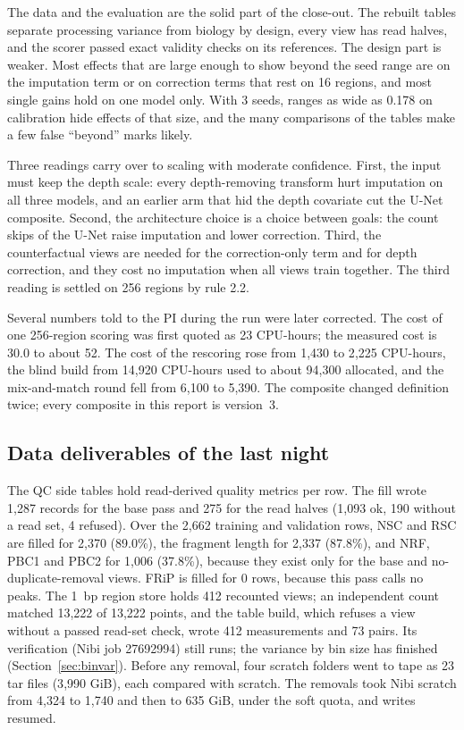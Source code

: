 \documentclass[pdflatex,sn-mathphys-num]{sn-jnl}
\newcommand{\lit}[1]{#1}
\newcommand{\cl}[1]{#1}
\newcommand{\arcGib}{3{,}990}
\newcommand{\arcTars}{23}
\newcommand{\blindNewCost}{94{,}300}
\newcommand{\blindOldCost}{14{,}920}
\newcommand{\bpMeas}{412}
\newcommand{\bpPairs}{73}
\newcommand{\bpPts}{13{,}222}
\newcommand{\bpPtsStore}{13{,}222}
\newcommand{\bpVerifyJob}{27692994}
\newcommand{\bpViews}{412}
\newcommand{\costAE}{30.0}
\newcommand{\costUN}{52}
\newcommand{\mixCost}{5{,}390}
\newcommand{\mixOldCost}{6{,}100}
\newcommand{\oldCheckCost}{1{,}430}
\newcommand{\oldScoreCost}{23}
\newcommand{\qcFrag}{2{,}337}
\newcommand{\qcFragPct}{87.8}
\newcommand{\qcFrip}{0}
\newcommand{\qcNoRead}{190}
\newcommand{\qcNrf}{1{,}006}
\newcommand{\qcNrfPct}{37.8}
\newcommand{\qcNsc}{2{,}370}
\newcommand{\qcNscPct}{89.0}
\newcommand{\qcOk}{1{,}093}
\newcommand{\qcPrOne}{275}
\newcommand{\qcRefused}{4}
\newcommand{\qcRows}{2{,}662}
\newcommand{\qcWhole}{1{,}287}
\newcommand{\refAECalR}{0.178}
\newcommand{\rescoreCost}{2{,}225}
\newcommand{\rescoreDiscuss}{The third reading is settled on 256 regions by rule 2.2.}
\newcommand{\scAfter}{635}
\newcommand{\scBefore}{4{,}324}
\newcommand{\scMid}{1{,}740}
\begin{document}
\cl{The data and the evaluation are the solid part of the close-out. The rebuilt tables separate processing variance from biology by design, every view has read halves, and the scorer passed exact validity checks on its references. The design part is weaker. Most effects that are large enough to show beyond the seed range are on the imputation term or on correction terms that rest on \lit{16} regions, and most single gains hold on one model only. With \lit{3} seeds, ranges as wide as \refAECalR{} on calibration hide effects of that size, and the many comparisons of the tables make a few false ``beyond'' marks likely.}

\cl{Three readings carry over to scaling with moderate confidence. First, the input must keep the depth scale: every depth-removing transform hurt imputation on all three models, and an earlier arm that hid the depth covariate cut the U-Net composite. Second, the architecture choice is a choice between goals: the count skips of the U-Net raise imputation and lower correction. Third, the counterfactual views are needed for the correction-only term and for depth correction, and they cost no imputation when all views train together. \rescoreDiscuss{}}

\cl{Several numbers told to the PI during the run were later corrected. The cost of one \lit{256}-region scoring was first quoted as \oldScoreCost{} CPU-hours; the measured cost is \costAE{} to about \costUN{}. The cost of the rescoring rose from \oldCheckCost{} to \rescoreCost{} CPU-hours, the blind build from \blindOldCost{} CPU-hours used to about \blindNewCost{} allocated, and the mix-and-match round fell from \mixOldCost{} to \mixCost{}. The composite changed definition twice; every composite in this report is version~\lit{3}.}

\subsection{Data deliverables of the last night}

\cl{The QC side tables hold read-derived quality metrics per row. The fill wrote \qcWhole{} records for the base pass and \qcPrOne{} for the read halves (\qcOk{} ok, \qcNoRead{} without a read set, \qcRefused{} refused). Over the \qcRows{} training and validation rows, NSC and RSC are filled for \qcNsc{} (\qcNscPct{}\%), the fragment length for \qcFrag{} (\qcFragPct{}\%), and NRF, \lit{PBC1} and \lit{PBC2} for \qcNrf{} (\qcNrfPct{}\%), because they exist only for the base and no-duplicate-removal views. FRiP is filled for \qcFrip{} rows, because this pass calls no peaks. The \lit{1}~bp region store holds \bpViews{} recounted views; an independent count matched \bpPts{} of \bpPtsStore{} points, and the table build, which refuses a view without a passed read-set check, wrote \bpMeas{} measurements and \bpPairs{} pairs. Its verification (Nibi job \bpVerifyJob{}) still runs; the variance by bin size has finished (Section~\ref{sec:binvar}). Before any removal, four scratch folders went to tape as \arcTars{} tar files (\arcGib{} GiB), each compared with scratch. The removals took Nibi scratch from \scBefore{} to \scMid{} and then to \scAfter{} GiB, under the soft quota, and writes resumed.}
\end{document}
